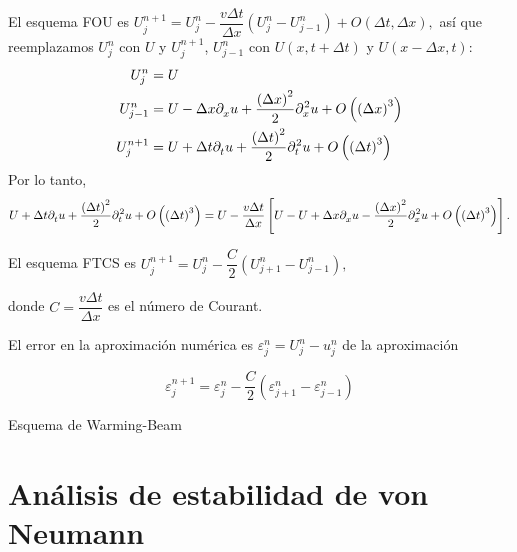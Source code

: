 El esquema FOU es
\begin{math}
    U^{n+1}_{j}=
    U^{n}_{j}-
    \dfrac{v\Delta t}{\Delta x}
    \left(U^{n}_{j}-U^{n}_{j-1}\right)+
    O\left(\Delta t,\Delta x\right),
\end{math}
así que reemplazamos $U^{n}_{j}$ con $U$ y $U^{n+1}_{j}$, $U^{n}_{j-1}$ con $U\left(x, t+\Delta t\right)$ y $U\left(x-\Delta x, t\right)$:
\begin{align*}
    U^{n}_{j}   & =
    U                                         \\
    U^{n}_{j-1} & =
    U-
    \Delta x\difcp{u}{x}+
    \dfrac{{\left(\Delta x\right)}^{2}}{2}
    \difcp[2]{u}{x}+
    O\left({\left(\Delta x\right)}^{3}\right) \\
    U^{n+1}_{j} & =
    U+
    \Delta t\difcp{u}{t}+
    \dfrac{{\left(\Delta t\right)}^{2}}{2}
    \difcp[2]{u}{t}+
    O\left({\left(\Delta t\right)}^{3}\right)
\end{align*}
Por lo tanto,
\begin{equation*}
    U+
    \Delta t\difcp{u}{t}+
    \dfrac{{\left(\Delta t\right)}^{2}}{2}
    \difcp[2]{u}{t}+
    O\left({\left(\Delta t\right)}^{3}\right)=
    U-
    \dfrac{v\Delta t}{\Delta x}
    \left[
        U-
        U+
        \Delta x \difcp{u}{x}-
        \dfrac{{\left(\Delta x\right)}^{2}}{2}\difcp[2]{u}{x}+
        O\left({\left(\Delta t\right)}^{3}\right)
        \right].
\end{equation*}

El esquema FTCS es
\begin{math}
    U^{n+1}_{j}=
    U^{n}_{j}-
    \dfrac{C}{2}
    \left(U^{n}_{j+1}-U^{n}_{j-1}\right),
\end{math}

donde $C=\dfrac{v\Delta t}{\Delta x}$ es el número de Courant.

El error en la aproximación numérica es $\varepsilon^{n}_{j}=U^{n}_{j}-u^{n}_{j}$ de la aproximación

\begin{equation*}
    \varepsilon^{n+1}_{j}=
    \varepsilon^{n}_{j}-
    \dfrac{C}{2}
    \left(\varepsilon^{n}_{j+1}-\varepsilon^{n}_{j-1}\right)
\end{equation*}

Esquema de Warming-Beam

\section*{Análisis de estabilidad de von Neumann}

